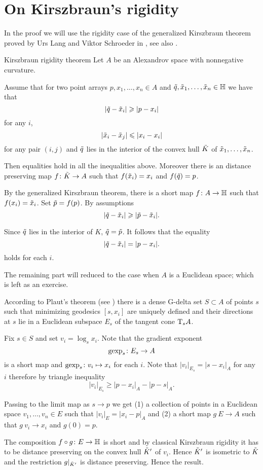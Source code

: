 \section{On Kirszbraun's rigidity}
In the proof we will use the rigidity case of the generalized Kirszbraun theorem proved by Urs Lang and Viktor Schroeder in \cite{LS}, see also \cite{AKP}.

\begin{thm}{Kirszbraun rigidity theorem}\label{thm:kirszbraun-rigid}
Let $A$ be an Alexandrov space with nonnegative curvature.

Assume that for two point arrays $p,x_1,\dots,x_n\in A$ and $\~q, \~x_1,\dots,\~x_n\in \HH$ we have that 
\[|\~q-\~x_i|\ge |p-x_i|\]
for any $i$,
\[|\~x_i-\~x_j|\le |x_i-x_i|\]
for any pair $(i,j)$
and $\~q$ lies in the interior of the convex hull $\~K$ of $\~x_1,\dots,\~x_n$.

Then equalities hold in all the inequalities above.
Moreover there is an distance preserving map $f\:\~K\to A$ such that $f(\~x_i)=x_i$ and $f(\~q)=p$. 
\end{thm}

By the generalized Kirszbraun theorem, there is a short map $f\:A\to \HH$
such that $f(x_i)=\~x_i$.
Set  $\~p=f(p)$.
By assumptions
\[|\~q-\~x_i|\ge |\~p-\~x_i|.\]

Since $\~q$ lies in the interior of $K$, $\~q=\~p$.
It follows that the equality 
\[|\~q-\~x_i|= |p-x_i|.\]
holds for each $i$.

The remaining part will reduced to the case when $A$ is a Euclidean space;
which is left as an exercise.

According to Plaut's theorem (see \cite{AKP}) there is a dense G-delta set $S\subset A$ of points $s$ such that minimizing geodesics $[s,x_i]$ are uniquely defined and their directions at $s$ lie in a Euclidean subspace $E_s$ of the tangent cone $\T_sA$.

Fix $s\in S$ and set $v_i=\log_sx_i$.
Note that the gradient exponent 
\[\gexp_s\:E_s\to A\]
is a short map and $\gexp_s\:v_i\mapsto x_i$ for each $i$.
Note that $|v_i|_{E_s}=|s-x_i|_A$ for any $i$ therefore by triangle inequality
\[|v_i|_{E_s}\ge |p-x_i|_A-|p-s|_A.\]

Passing to the limit map as $s\to p$ we get (1) a collection of points in a Euclidean space $v_1,\dots,v_n\in E$ such that $|v_i|_E=|x_i-p|_A$
and (2) a short map $g\:E\to A$ such that $g\:v_i\to x_i$ and $g(0)=p$.

The composition $f\circ g\:E\to \HH$ is short
and by classical Kirszbraun rigidity it has to be distance preserving on the convex hull $\~K'$ of $v_i$.
Hence $\~K'$ is isometric to $\~K$ and the restriction $g|_{\~K'}$ is distance preserving. 
Hence the result.
\qeds
